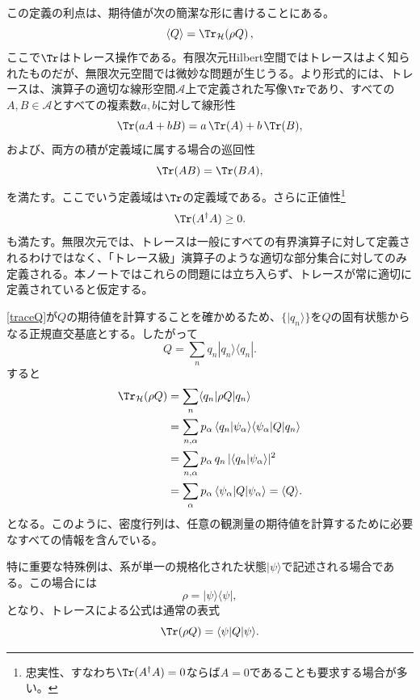 \documentclass[a4paper,11pt,oneside]{article}
\theoremstyle{definition}
\numberwithin{equation}{section}
\begin{document}
この定義の利点は、期待値が次の簡潔な形に書けることにある。
\begin{equation}\label{traceQ}
\langle Q \rangle = \Tr_{\mathcal H}(\rho Q) \,,
\end{equation}
ここで$ \Tr$はトレース操作である。有限次元Hilbert空間ではトレースはよく知られたものだが、無限次元空間では微妙な問題が生じうる。より形式的には、トレースは、演算子の適切な線形空間$\mathcal A$上で定義された写像$\Tr$であり、すべての$A,B\in\mathcal A$とすべての複素数$a,b$に対して線形性
\begin{equation}
\Tr(aA+bB)=a\,\Tr(A)+b\,\Tr(B) ,
\end{equation}
および、両方の積が定義域に属する場合の巡回性
\begin{equation}
\Tr(AB)=\Tr(BA) ,
\end{equation}
を満たす。ここでいう定義域は$\Tr$の定義域である。さらに正値性\footnote{忠実性、すなわち$\Tr(A^\dagger A)=0$ならば$A=0$であることも要求する場合が多い。}
\begin{equation}
\Tr(A^\dagger A)\ge 0 .
\end{equation}
も満たす。無限次元では、トレースは一般にすべての有界演算子に対して定義されるわけではなく、「トレース級」演算子のような適切な部分集合に対してのみ定義される。本ノートではこれらの問題には立ち入らず、トレースが常に適切に定義されていると仮定する。



\eqref{traceQ}が$ Q$の期待値を計算することを確かめるため、$\{|q_n\rangle\}$を$Q$の固有状態からなる正規直交基底とする。したがって
\begin{equation}
Q = \sum_n q_n |q_n\rangle\langle q_n| .
\end{equation}
すると
\begin{align}
\Tr_{\mathcal H}(\rho Q)
&= \sum_n \langle q_n | \rho Q | q_n \rangle \\
&= \sum_{n,\alpha} p_\alpha \, \langle q_n | \psi_\alpha \rangle \langle \psi_\alpha | Q | q_n \rangle \\
&= \sum_{n,\alpha} p_\alpha \, q_n \, |\langle q_n | \psi_\alpha \rangle|^2 \\
&= \sum_\alpha p_\alpha \, \langle \psi_\alpha | Q | \psi_\alpha \rangle = \langle Q \rangle .
\end{align}
となる。このように、密度行列は、任意の観測量の期待値を計算するために必要なすべての情報を含んでいる。



特に重要な特殊例は、系が単一の規格化された状態$|\psi\rangle$で記述される場合である。この場合には
\begin{equation}
\rho = |\psi\rangle\langle\psi| ,
\end{equation}
となり、トレースによる公式は通常の表式
\begin{equation}
\Tr(\rho Q) = \langle \psi | Q | \psi \rangle .
\end{equation}
\end{document}
